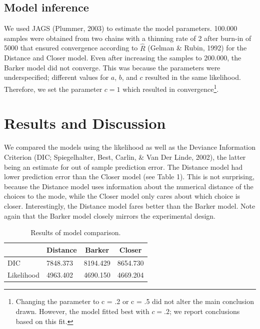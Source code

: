 \documentclass[english,floatsintext,man]{apa6}
\begin{document}
\subsection{Model inference}\label{model-inference}

We used JAGS (Plummer, 2003) to estimate the model parameters. 100.000
samples were obtained from two chains with a thinning rate of 2 after
burn-in of 5000 that ensured convergence according to \(\hat R\) (Gelman
\& Rubin, 1992) for the Distance and Closer model. Even after increasing
the samples to 200.000, the Barker model did not converge. This was
because the parameters were underspecified; different values for \(a\),
\(b\), and \(c\) resulted in the same likelihood. Therefore, we set the
parameter \(c = 1\) which resulted in
convergence\footnote{Changing the parameter to c = .2 or c = .5 did not alter the main conclusion drawn. However, the model fitted best with $c = .2$; we report conclusions based on this fit.}.

\section{Results and Discussion}\label{results-and-discussion}

We compared the models using the likelihood as well as the Deviance
Information Criterion (DIC; Spiegelhalter, Best, Carlin, \& Van Der
Linde, 2002), the latter being an estimate for out of sample prediction
error. The Distance model had lower prediction error than the Closer
model (see Table 1). This is not surprising, because the Distance model
uses information about the numerical distance of the choices to the
mode, while the Closer model only cares about which choice is closer.
Interestingly, the Distance model fares better than the Barker model.
Note again that the Barker model closely mirrors the experimental
design.

\begin{table}[tbp]
\begin{center}
\begin{threeparttable}
\caption{Results of model comparison.}
\begin{tabular}{llll}
\toprule
 & \multicolumn{1}{c}{Distance} & \multicolumn{1}{c}{Barker} & \multicolumn{1}{c}{Closer}\\
\midrule
DIC & 7848.373 & 8194.429 & 8654.730\\
Likelihood & 4963.402 & 4690.150 & 4669.204\\
\bottomrule
\end{tabular}
\end{threeparttable}
\end{center}
\end{table}
\end{document}
